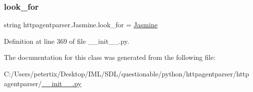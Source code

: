 \subsubsection{\texorpdfstring{look\+\_\+for}{look\_for}}
{\footnotesize\ttfamily string httpagentparser.\+Jasmine.\+look\+\_\+for = \textquotesingle{}\hyperlink{classhttpagentparser_1_1_jasmine}{Jasmine}\textquotesingle{}\hspace{0.3cm}{\ttfamily [static]}}



Definition at line 369 of file \+\_\+\+\_\+init\+\_\+\+\_\+.\+py.



The documentation for this class was generated from the following file\+:\begin{DoxyCompactItemize}
\item 
C\+:/\+Users/petertix/\+Desktop/\+I\+M\+L/\+S\+D\+L/questionable/python/httpagentparser/httpagentparser/\hyperlink{____init_____8py}{\+\_\+\+\_\+init\+\_\+\+\_\+.\+py}\end{DoxyCompactItemize}

